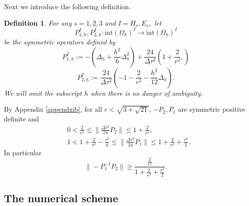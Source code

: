 \documentclass[12pt,reqno]{amsart}
\newtheorem{defi}[theorem]{Definition}
\theoremstyle{definition}
\numberwithin{equation}{section}
\newcommand{\intr}[1]{\mathrm{int}(#1)}
\def\Gwh{\Omega_h}
\begin{document}
	
	Next we introduce the following definition.
	\begin{defi}
		For any $s=1,2,3$ and $I= H_s, E_s,$
		let $$P_{1,h}^{I}, P_{2,h}^{I}:\intr\Gwh^{I}\to \intr\Gwh^{I}$$ be the symmetric operators defined by
		$$
		P_{1,h}^{I}:=-\left (\Delta_h+\frac{h^2}{6}\Delta_h^2\right)+\frac{24}{\Delta \tau^2}\left (
		1+\frac{2}{r^2},
		\right)
		$$
		$$
		P_{2,h}^{I}:=\frac{24}{\Delta \tau^2}\left (
		-1-\frac{2}{r^2}-\frac{h^2}{12}\Delta_h
		\right).
		$$	
		We will omit the subscript $h$ when there is no danger of ambiguity.	
		
	\end{defi}
	By  Appendix \ref{appendxib}, for all $r<\sqrt{3+\sqrt{21}}$,
	$-P_2, P_1$ are symmetric  positive definite
	and
	\begin{align}\label{eq:P1P2estimates}
		&
		0<\frac{2}{r^2}\leq \|\frac{\Delta \tau^2}{24}P_2\|\leq 1+\frac{2}{r^2},\\&
		1<1+\frac{2}{r^2}-\frac{r^2}{6}\leq\|\frac{\Delta \tau^2}{24}P_1\|\leq 1+\frac{2}{r^2}+\frac{r^2}{2}.
	\end{align} 
	In particular 
	$$
	\|-P_1^{-1}P_2\|\geq \frac{\frac{2}{r^2}}{1+\frac{2}{r^2}+\frac{r^2}{2}}.
	$$
	
	
	
	
\subsection{The numerical scheme}
\end{document}
